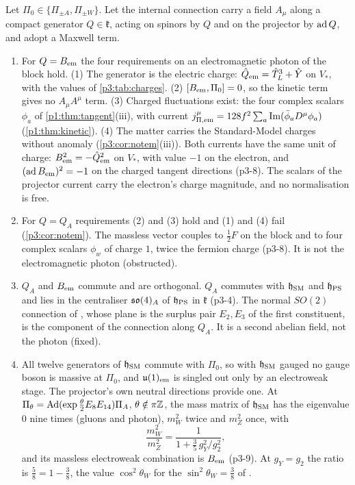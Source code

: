 \begin{theorem}
\label{p3:thm:photon}
Let $\Pi_0\in\{\Pi_{\pm A},\Pi_{\pm W}\}$. Let the internal connection carry a field $A_\mu$ along a compact generator $Q\in\mathfrak k$, acting on spinors by $Q$ and on the
projector by $\ad Q$, and adopt a Maxwell term.
\begin{enumerate}[label=(\alph*),leftmargin=2.2em]
\item For $Q=B_{\rm em}$ the four requirements on an electromagnetic photon of the block hold. (1) The generator is the electric charge: $\hat Q_{\rm em}=\hat T^3_L+\hat Y$ on
$V_*$, with the values of \cref{p3:tab:charges}. (2) $[B_{\rm em},\Pi_0]=0$, so the kinetic term gives no $A_\mu A^\mu$ term. (3) Charged fluctuations exist: the four complex
scalars $\phi_a$ of \cref{p1:thm:tangent}(iii), with current $j^\mu_{\Pi,\rm em}=128f^2\sum_a\Im(\bar\phi_aD^\mu\phi_a)$ (\cref{p1:thm:kinetic}). (4) The matter carries the
Standard-Model charges without anomaly (\cref{p3:cor:notem}(iii)). Both currents have the same unit of charge: $B_{\rm em}^2=-\hat Q_{\rm em}^2$ on $V_*$, with value $-1$ on
the electron, and $(\ad B_{\rm em})^2=-1$ on the charged tangent directions (p3-8). The scalars of the projector current carry the electron's charge magnitude, and no
normalisation is free.
\item For $Q=Q_A$ requirements (2) and (3) hold and (1) and (4) fail (\cref{p3:cor:notem}). The massless vector couples to $\tfrac12F$ on the block and to four complex
scalars $\phi_w$ of charge $1$, twice the fermion charge (p3-8). It is not the electromagnetic photon (obstructed).
\item $Q_A$ and $B_{\rm em}$ commute and are orthogonal. $Q_A$ commutes with $\mathfrak h_{\rm SM}$ and $\mathfrak h_{\rm PS}$ and lies in the centraliser $\so4_A$ of
$\mathfrak h_{\rm PS}$ in $\mathfrak k$ (p3-4). The normal $SO(2)$ connection of \cite[Thm.~26.8]{ES17}, whose plane is the surplus pair $E_2,E_3$ of the first
constituent, is the component of the connection along $Q_A$. It is a second abelian field, not the photon (fixed).
\item All twelve generators of $\mathfrak h_{\rm SM}$ commute with $\Pi_0$, so with $\mathfrak h_{\rm SM}$ gauged no gauge boson is massive at $\Pi_0$, and $\uu1_{\rm em}$
is singled out only by an electroweak stage. The projector's own neutral directions provide one. At $\Pi_\theta=\Ad(\exp\tfrac\theta2E_8E_{14})\Pi_A$, $\theta\notin\pi\Z$, the
mass matrix of $\mathfrak h_{\rm SM}$ has the eigenvalue $0$ nine times (gluons and photon), $m_W^2$ twice and $m_Z^2$ once, with
\[
\frac{m_W^2}{m_Z^2}=\frac1{1+\tfrac35\,g_Y^2/g_2^2},
\]
and its massless electroweak combination is $B_{\rm em}$ (p3-9). At $g_Y=g_2$ the ratio is $\tfrac58=1-\tfrac38$, the value $\cos^2\theta_W$ for the
$\sin^2\theta_W=\tfrac38$ of \cite[Thm.~21.1]{ES17}.
\end{enumerate}
\end{theorem}


